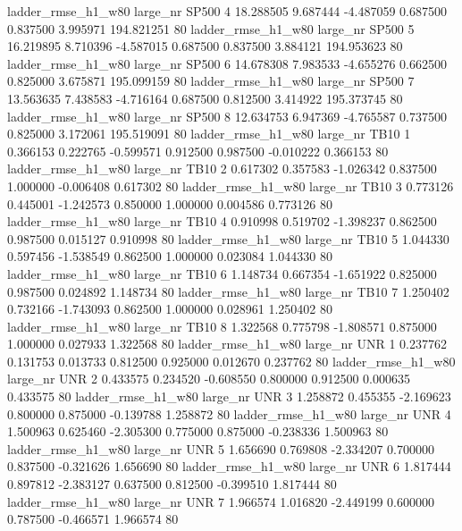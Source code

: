  ladder_rmse_h1_w80   large_nr    SP500                 4 18.288505  9.687444  -4.487059 0.687500 0.837500  3.995971  194.821251 80
 ladder_rmse_h1_w80   large_nr    SP500                 5 16.219895  8.710396  -4.587015 0.687500 0.837500  3.884121  194.953623 80
 ladder_rmse_h1_w80   large_nr    SP500                 6 14.678308  7.983533  -4.655276 0.662500 0.825000  3.675871  195.099159 80
 ladder_rmse_h1_w80   large_nr    SP500                 7 13.563635  7.438583  -4.716164 0.687500 0.812500  3.414922  195.373745 80
 ladder_rmse_h1_w80   large_nr    SP500                 8 12.634753  6.947369  -4.765587 0.737500 0.825000  3.172061  195.519091 80
 ladder_rmse_h1_w80   large_nr     TB10                 1  0.366153  0.222765  -0.599571 0.912500 0.987500 -0.010222    0.366153 80
 ladder_rmse_h1_w80   large_nr     TB10                 2  0.617302  0.357583  -1.026342 0.837500 1.000000 -0.006408    0.617302 80
 ladder_rmse_h1_w80   large_nr     TB10                 3  0.773126  0.445001  -1.242573 0.850000 1.000000  0.004586    0.773126 80
 ladder_rmse_h1_w80   large_nr     TB10                 4  0.910998  0.519702  -1.398237 0.862500 0.987500  0.015127    0.910998 80
 ladder_rmse_h1_w80   large_nr     TB10                 5  1.044330  0.597456  -1.538549 0.862500 1.000000  0.023084    1.044330 80
 ladder_rmse_h1_w80   large_nr     TB10                 6  1.148734  0.667354  -1.651922 0.825000 0.987500  0.024892    1.148734 80
 ladder_rmse_h1_w80   large_nr     TB10                 7  1.250402  0.732166  -1.743093 0.862500 1.000000  0.028961    1.250402 80
 ladder_rmse_h1_w80   large_nr     TB10                 8  1.322568  0.775798  -1.808571 0.875000 1.000000  0.027933    1.322568 80
 ladder_rmse_h1_w80   large_nr      UNR                 1  0.237762  0.131753   0.013733 0.812500 0.925000  0.012670    0.237762 80
 ladder_rmse_h1_w80   large_nr      UNR                 2  0.433575  0.234520  -0.608550 0.800000 0.912500  0.000635    0.433575 80
 ladder_rmse_h1_w80   large_nr      UNR                 3  1.258872  0.455355  -2.169623 0.800000 0.875000 -0.139788    1.258872 80
 ladder_rmse_h1_w80   large_nr      UNR                 4  1.500963  0.625460  -2.305300 0.775000 0.875000 -0.238336    1.500963 80
 ladder_rmse_h1_w80   large_nr      UNR                 5  1.656690  0.769808  -2.334207 0.700000 0.837500 -0.321626    1.656690 80
 ladder_rmse_h1_w80   large_nr      UNR                 6  1.817444  0.897812  -2.383127 0.637500 0.812500 -0.399510    1.817444 80
 ladder_rmse_h1_w80   large_nr      UNR                 7  1.966574  1.016820  -2.449199 0.600000 0.787500 -0.466571    1.966574 80
